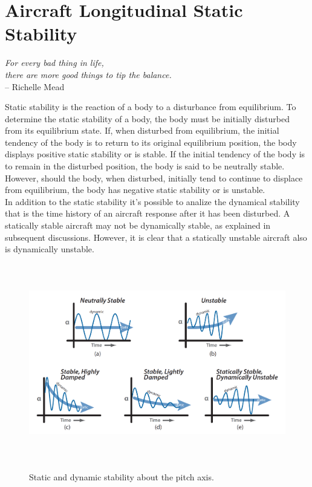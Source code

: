 \chapter{Aircraft Longitudinal Static Stability}
\label{ch:workobject}
\begin{flushright}
	{\smaller
		\textit{For every bad thing in life, \\ there are more good things to tip the balance.}\\
		--  Richelle Mead}
\end{flushright}


Static stability is the reaction of a body to a disturbance from equilibrium. To determine the static stability of a body, the body must be initially disturbed from its equilibrium state. If, when disturbed from equilibrium, the initial tendency of the body is to return to its original equilibrium position, the body displays positive static stability or is stable. If the initial tendency of the body is to remain in the disturbed position, the body is said to be neutrally stable. However, should the body, when disturbed, initially tend to continue to displace from equilibrium, the body has negative static stability or is unstable. \cite{airf}\\
In addition to the static stability it's possible to analize the dynamical stability that is the time history of an aircraft response after it has been disturbed. A statically stable aircraft may not be dynamically stable, as explained in subsequent discussions. However, it is clear that a statically unstable aircraft also is dynamically unstable.

\begin{figure}[H]
\centering
{\includegraphics[height=8.6cm]{Immagini/stability}} 
\label{wblc}
\caption{Static and dynamic stability about the pitch axis.}
\end{figure} 		

